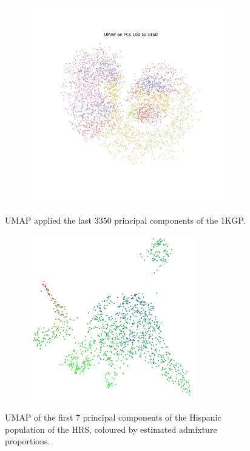 \documentclass[12pt]{pnas-new}
\begin{document}
\begin{figure}
    \centering
    \begin{subfigure}{0.95\textwidth}
    \includegraphics[width=0.95\textwidth]{images/1KGP_UMAP_PCS100_PCE3450_NC2_NN15_MD05_201944185843.jpeg}
    \end{subfigure}
    \caption{UMAP applied the last 3350 principal components of the 1KGP.}
    \label{fig:supp_1kgp_3350}
\end{figure}

\begin{figure}
    \centering
    \begin{subfigure}{\textwidth}
    \includegraphics[width=0.8\textwidth]{images/HRS_1000G_NP1_UMAP_PC7_NC2_NN15_MD05_pca_hrshisp_added1kgp_2018115153245_admix.pdf}
    \end{subfigure}
    \caption{UMAP of the first 7 principal components of the Hispanic population of the HRS, coloured by estimated admixture proportions.}
    \label{fig:supp_umap_hrs_hisp_admix}
\end{figure}
\end{document}
